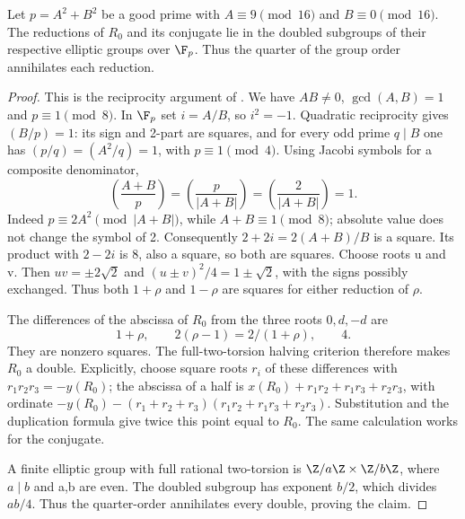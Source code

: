 \begin{lemma}
\label{q198:half-generator-reduction}
Let $p=A^2+B^2$ be a good prime with
$A\equiv9\pmod{16}$ and $B\equiv0\pmod{16}$.
The reductions of $R_0$ and its conjugate lie in the doubled
subgroups of their respective elliptic groups over $\F_p$.
Thus the quarter of the group order annihilates each reduction.
\end{lemma}
\begin{proof}
This is the reciprocity argument of
\cite[Lemma 5.1]{q198-BroxWeighted}.
We have $AB\ne0$, $\gcd(A,B)=1$ and $p\equiv1\pmod8$.
In $\F_p$ set $i=A/B$, so $i^2=-1$.
Quadratic reciprocity gives $(B/p)=1$: its sign and 2-part are
squares, and for every odd prime $q\mid B$ one has
$(p/q)=(A^2/q)=1$, with $p\equiv1\pmod4$.
Using Jacobi symbols for a composite denominator,
\[
 \left(\frac{A+B}{p}\right)
 =\left(\frac p{|A+B|}\right)
 =\left(\frac2{|A+B|}\right)=1.
\]
Indeed $p\equiv2A^2\pmod{|A+B|}$, while $A+B\equiv1\pmod8$;
absolute value does not change the symbol of 2. Consequently
$2+2i=2(A+B)/B$ is a square. Its product with $2-2i$ is 8,
also a square, so both are squares. Choose roots u and v.
Then $uv=\pm2\sqrt2$ and
$(u\pm v)^2/4=1\pm\sqrt2$, with the signs possibly exchanged.
Thus both $1+\rho$ and $1-\rho$ are squares for either reduction
of $\rho$.

The differences of the abscissa of $R_0$ from the three roots
$0,d,-d$ are
\[
              1+\rho,\qquad 2(\rho-1)=2/(1+\rho),\qquad4.
\]
They are nonzero squares. The full-two-torsion halving criterion
therefore makes $R_0$ a double. Explicitly, choose square roots
$r_i$ of these differences with $r_1r_2r_3=-y(R_0)$;
the abscissa of a half is
$x(R_0)+r_1r_2+r_1r_3+r_2r_3$, with ordinate
$-y(R_0)-(r_1+r_2+r_3)(r_1r_2+r_1r_3+r_2r_3)$.
Substitution and the duplication formula give twice this point equal
to $R_0$. The same calculation works for the conjugate.

A finite elliptic group with full rational two-torsion is
$\Z/a\Z\times\Z/b\Z$, where $a\mid b$ and a,b are even.
The doubled subgroup has exponent $b/2$, which divides $ab/4$.
Thus the quarter-order annihilates every double, proving the claim.
\end{proof}

